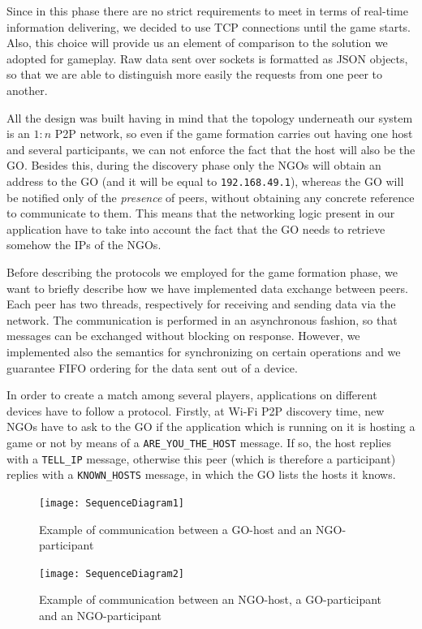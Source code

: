 Since in this phase there are no strict requirements to meet in terms of
real-time information delivering, we decided to use TCP connections until the
game starts. Also, this choice will provide us an element of comparison to the
solution we adopted for gameplay.
Raw data sent over sockets is formatted as JSON objects, so that we are able to
distinguish more easily the requests from one peer to another.

All the design was built having in mind that the topology underneath our system
is an $1:n$ P2P network, so even if the game formation carries out having one
host and several participants, we can not enforce the fact that the host will
also be the GO. Besides this, during the discovery phase only the NGOs will
obtain an address to the GO (and it will be equal to \texttt{192.168.49.1}),
whereas the GO will be notified only of the \textit{presence} of peers, without
obtaining any concrete reference to communicate to them. This means that the
networking logic present in our application have to take into account the fact
that the GO needs to retrieve somehow the IPs of the NGOs.

Before describing the protocols we employed for the game formation phase, we
want to briefly describe how we have implemented data exchange between peers.
Each peer has two threads, respectively for receiving and sending data via the
network. The communication is performed in an asynchronous fashion, so that
messages can be exchanged without blocking on response. However, we implemented
also the semantics for synchronizing on certain operations and we guarantee FIFO
ordering for the data sent out of a device.

In order to create a match among several players, applications on different
devices have to follow a protocol. Firstly, at Wi-Fi P2P discovery time, new
NGOs have to ask to the GO if the application which is running on it is hosting
a game or not by means of a \texttt{ARE\_YOU\_THE\_HOST} message. If so, the
host replies with a \texttt{TELL\_IP} message, otherwise this peer (which is
therefore a participant) replies with a \texttt{KNOWN\_HOSTS} message, in which
the GO lists the hosts it knows.

\begin{figure}[h]
    \centering
    \texttt{[image: SequenceDiagram1]}
    \caption{Example of communication between a GO-host and an NGO-participant}
    \label{fig:seqDiagram1}
\end{figure}

\begin{figure}[h]
    \centering
    \texttt{[image: SequenceDiagram2]}
    \caption{Example of communication between an NGO-host, a GO-participant
     and an NGO-participant}
    \label{fig:seqDiagram2}
\end{figure}

